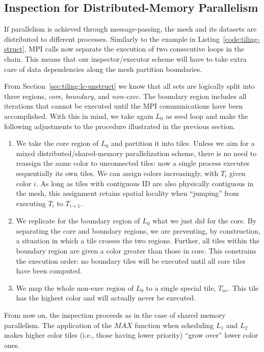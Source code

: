 \subsection*{Inspection for Distributed-Memory Parallelism}
If parallelism is achieved through message-passing, the mesh and its datasets are distributed to different processes. Similarly to the example in Listing~\ref{code:tiling-struct}, MPI calls now separate the execution of two consecutive loops in the chain. This means that our inspector/executor scheme will have to take extra care of data dependencies along the mesh partition boundaries.

From Section~\ref{sec:tiling:lc-unstruct} we know that all sets are logically split into three regions, \textit{core}, \textit{boundary}, and \textit{non-exec}. The boundary region includes all iterations that cannot be executed until the MPI communications have been accomplished. With this in mind, we take again $L_0$ as seed loop and make the following adjustments to the procedure illustrated in the previous section.
\begin{enumerate}
\item We take the core region of $L_0$ and partition it into tiles. Unless we aim for a mixed distributed/shared-memory parallelization scheme, there is no need to reassign the same color to unconnected tiles: now a single process executes sequentially its own tiles. We can assign colors increasingly, with $T_i$ given color $i$. As long as tiles with contiguous ID are also physically contiguous in the mesh, this assignment retains spatial locality when ``jumping'' from executing $T_i$ to $T_{i+1}$.
\item We replicate for the boundary region of $L_0$ what we just did for the core. By separating the core and boundary regions, we are preventing, by construction, a situation in which a tile crosses the two regions. Further, all tiles within the boundary region are given a color greater than those in core. This constrains the execution order: no boundary tiles will be executed until all core tiles have been computed.
\item We map the whole non-exec region of $L_0$ to a single special tile, $T_{ne}$. This tile has the highest color and will actually never be executed. 
\end{enumerate}

From now on, the inspection proceeds as in the case of shared memory parallelism. The application of the $MAX$ function when scheduling $L_1$ and $L_2$ makes higher color tiles (i.e., those having lower priority) ``grow over'' lower color ones. 

